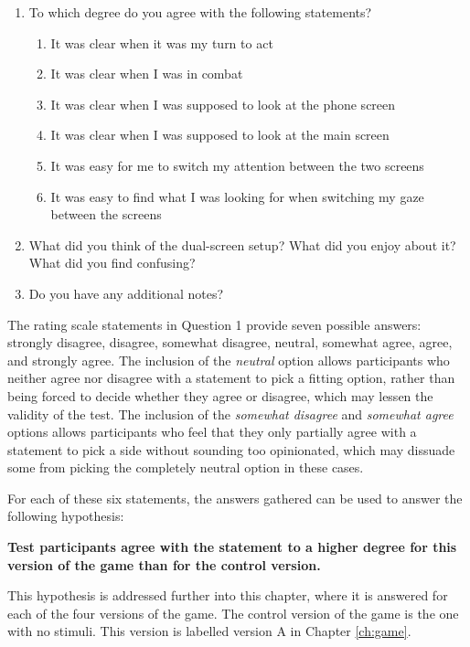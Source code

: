 \pagebreak
\begin{enumerate}
	\item To which degree do you agree with the following statements?
	\begin{enumerate}
		\item It was clear when it was my turn to act
		\item It was clear when I was in combat
		\item It was clear when I was supposed to look at the phone screen
		\item It was clear when I was supposed to look at the main screen
		\item It was easy for me to switch my attention between the two screens
		\item It was easy to find what I was looking for when switching my gaze between the screens
	\end{enumerate}
	\item What did you think of the dual-screen setup? What did you enjoy about it? What did you find confusing?
	\item Do you have any additional notes?
\end{enumerate}

The rating scale statements in Question 1 provide seven possible answers: strongly disagree, disagree, somewhat disagree, neutral, somewhat agree, agree, and strongly agree. The inclusion of the \textit{neutral} option allows participants who neither agree nor disagree with a statement to pick a fitting option, rather than being forced to decide whether they agree or disagree, which may lessen the validity of the test. The inclusion of the \textit{somewhat disagree} and \textit{somewhat agree} options allows participants who feel that they only partially agree with a statement to pick a side without sounding too opinionated, which may dissuade some from picking the completely neutral option in these cases.

For each of these six statements, the answers gathered can be used to answer the following hypothesis:

\begin{changemargin}{1cm}{1cm}
\textbf{Test participants agree with the statement to a higher degree for this version of the game than for the control version.}
\end{changemargin}

This hypothesis is addressed further into this chapter, where it is answered for each of the four versions of the game. The control version of the game is the one with no stimuli. This version is labelled version A in Chapter \ref{ch:game}.

